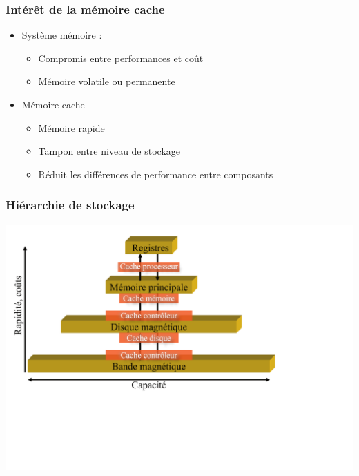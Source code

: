 \begin{frame}
\frametitle{Intérêt de la mémoire cache}
\begin{itemize}
\item Système mémoire :
\begin{itemize}
\item Compromis entre performances et coût
\item Mémoire volatile ou permanente
\end{itemize}
\item Mémoire cache
\begin{itemize}
\item Mémoire rapide
\item Tampon entre niveau de stockage
\item Réduit les différences de performance entre composants
\end{itemize}
\end{itemize}
\end{frame}


\begin{frame}
\frametitle{Hiérarchie de stockage}
\includegraphics[width=\textwidth]{../illustration/hierarchie_stockage.pdf}
\end{frame}


